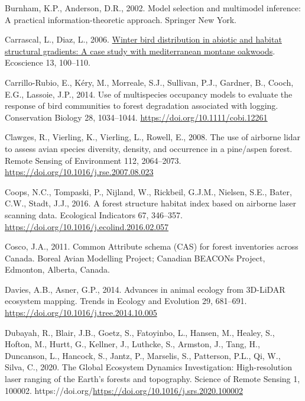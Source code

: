 \documentclass[
  12pt,
]{article}
\newlength{\cslhangindent}
\newlength{\cslentryspacingunit} %
\newenvironment{CSLReferences}[2] %
 {%
  \setlength{\parindent}{0pt}
  \ifodd #1
  \let\oldpar\par
  \def\par{\hangindent=\cslhangindent\oldpar}
  \fi
  \setlength{\parskip}{#2\cslentryspacingunit}
 }%
 {}
\begin{document}
\begin{CSLReferences}{1}{0}
\leavevmode{}%
Burnham, K.P., Anderson, D.R., 2002. Model selection and multimodel inference: {A} practical information-theoretic approach. Springer New York.

\leavevmode{}%
Carrascal, L., Diaz, L., 2006. \href{https://www.tandfonline.com/doi/abs/10.2980/1195-6860(2006)13\%5B100\%3AWBDIAA\%5D2.0.CO\%3B2}{Winter bird distribution in abiotic and habitat structural gradients: A case study with mediterranean montane oakwoods}. Ecoscience 13, 100--110.

\leavevmode{}%
Carrillo-Rubio, E., Kéry, M., Morreale, S.J., Sullivan, P.J., Gardner, B., Cooch, E.G., Lassoie, J.P., 2014. Use of multispecies occupancy models to evaluate the response of bird communities to forest degradation associated with logging. Conservation Biology 28, 1034--1044. \url{https://doi.org/10.1111/cobi.12261}

\leavevmode{}%
Clawges, R., Vierling, K., Vierling, L., Rowell, E., 2008. The use of airborne lidar to assess avian species diversity, density, and occurrence in a pine/aspen forest. Remote Sensing of Environment 112, 2064--2073. \url{https://doi.org/10.1016/j.rse.2007.08.023}

\leavevmode{}%
Coops, N.C., Tompaski, P., Nijland, W., Rickbeil, G.J.M., Nielsen, S.E., Bater, C.W., Stadt, J.J., 2016. A forest structure habitat index based on airborne laser scanning data. Ecological Indicators 67, 346--357. \url{https://doi.org/10.1016/j.ecolind.2016.02.057}

\leavevmode{}%
Cosco, J.A., 2011. Common {Attribute} schema ({CAS}) for forest inventories across {Canada}. Boreal Avian Modelling Project; Canadian BEACONs Project, Edmonton, Alberta, Canada.

\leavevmode{}%
Davies, A.B., Asner, G.P., 2014. Advances in animal ecology from {3D}-{LiDAR} ecosystem mapping. Trends in Ecology and Evolution 29, 681--691. \url{https://doi.org/10.1016/j.tree.2014.10.005}

\leavevmode{}%
Dubayah, R., Blair, J.B., Goetz, S., Fatoyinbo, L., Hansen, M., Healey, S., Hofton, M., Hurtt, G., Kellner, J., Luthcke, S., Armston, J., Tang, H., Duncanson, L., Hancock, S., Jantz, P., Marselis, S., Patterson, P.L., Qi, W., Silva, C., 2020. The {Global} {Ecosystem} {Dynamics} {Investigation}: {High}-resolution laser ranging of the {Earth}'s forests and topography. Science of Remote Sensing 1, 100002. https://doi.org/\url{https://doi.org/10.1016/j.srs.2020.100002}


\end{CSLReferences}
\end{document}
